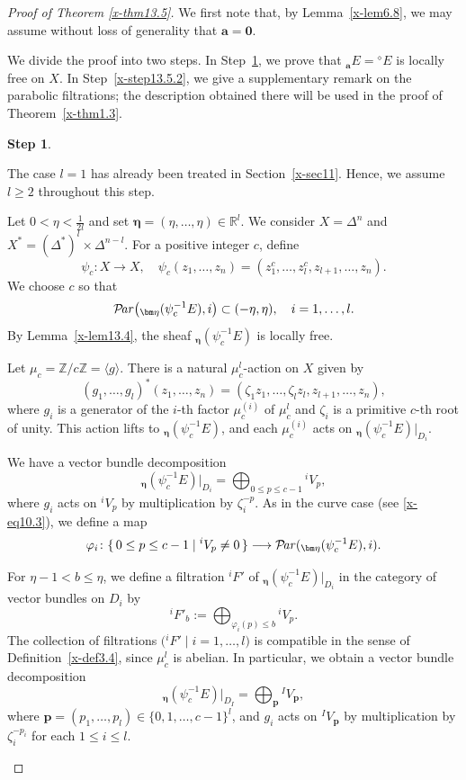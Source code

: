 \documentclass[12pt,twoside]{amsart}
\DeclareMathOperator{\Par}{\mathcal{P}\!\it{ar}}
\theoremstyle{definition}
\newtheorem{step}{Step}
\begin{document}
\begin{proof}[Proof of Theorem \ref{x-thm13.5}] 
We first note that, by Lemma~\ref{x-lem6.8}, we may assume without loss of
generality that $\bm a=\bm 0$.

We divide the proof into two steps.
In Step~\ref{x-step13.5.1}, we prove that
${}_{\bm a}E = {}^\diamond\!E$ is locally free on $X$.
In Step~\ref{x-step13.5.2}, we give a supplementary remark on the
parabolic filtrations; the description obtained there will be used in
the proof of Theorem~\ref{x-thm1.3}.

\setcounter{step}{0}
\begin{step}\label{x-step13.5.1}

The case $l=1$ has already been treated in Section~\ref{x-sec11}.
Hence, we assume $l\ge 2$ throughout this step.

Let $0<\eta<\frac{1}{2l}$ and set
$\bm \eta=(\eta,\dots,\eta)\in \mathbb R^l$.
We consider $X=\Delta^n$ and $X^*=(\Delta^*)^l\times \Delta^{n-l}$.
For a positive integer $c$, define
\[
\psi_c\colon X\to X, \quad
\psi_c(z_1,\dots,z_n)=(z_1^c,\dots,z_l^c,z_{l+1},\dots,z_n).
\]
We choose $c$ so that
\[
\Par\!\left({}_{\bm \eta} (\psi_c^{-1} E), i\right)
\subset (-\eta,\eta), \quad i=1,\dots,l.
\]
By Lemma~\ref{x-lem13.4}, the sheaf
${}_{\bm \eta} (\psi_c^{-1} E)$ is locally free.

Let $\mu_c=\mathbb Z/c\mathbb Z=\langle g\rangle$.
There is a natural $\mu_c^l$-action on $X$ given by
\[
(g_1,\dots,g_l)^*(z_1,\dots,z_n)
=(\zeta_1 z_1,\dots,\zeta_l z_l, z_{l+1},\dots,z_n),
\]
where $g_i$ is a generator of the $i$-th factor
$\mu_c^{(i)}$ of $\mu_c^l$ and $\zeta_i$ is a primitive $c$-th root of
unity.
This action lifts to ${}_{\bm \eta} (\psi_c^{-1} E)$, and each
$\mu_c^{(i)}$ acts on
${}_{\bm \eta} (\psi_c^{-1} E)|_{D_i}$.

We have a vector bundle decomposition
\[
{}_{\bm \eta} (\psi_c^{-1} E)|_{D_i}
= \bigoplus_{0\le p\le c-1} {}^i V_p,
\]
where $g_i$ acts on ${}^i V_p$ by multiplication by $\zeta_i^{-p}$.
As in the curve case (see \eqref{x-eq10.3}), we define a map
\[
\varphi_i\colon
\{\,0\le p\le c-1 \mid {}^i V_p\neq 0\,\}
\longrightarrow
\Par({}_{\bm \eta} (\psi_c^{-1} E), i).
\]

For $\eta-1<b\le \eta$, we define a filtration
${}^i\!F'$ of ${}_{\bm \eta} (\psi_c^{-1} E)|_{D_i}$ in the category of
vector bundles on $D_i$ by
\begin{equation}\label{x-eq13.2}
{}^i\!F'_b
:= \bigoplus_{\varphi_i(p)\le b} {}^i V_p .
\end{equation}
The collection of filtrations
$\bigl({}^i\!F'\mid i=1,\ldots,l\bigr)$
is compatible in the sense of Definition~\ref{x-def3.4},
since $\mu_c^l$ is abelian.
In particular, we obtain a vector bundle decomposition
\begin{equation}\label{x-eq13.3}
{}_{\bm \eta}\!\left(\psi_c^{-1}E\right)\big|_{D_I}
= \bigoplus_{\bm p} {}^I V_{\bm p},
\end{equation}
where $\bm p=(p_1,\ldots,p_l)\in\{0,1,\ldots,c-1\}^l$,
and $g_i$ acts on ${}^I V_{\bm p}$ by multiplication by
$\zeta_i^{-p_i}$ for each $1\le i\le l$.


\end{step}
\end{proof}
\end{document}
